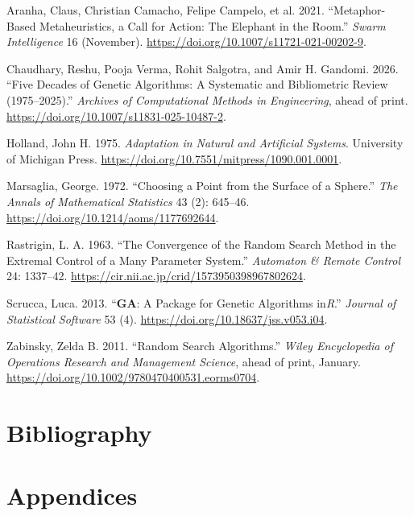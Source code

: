 \documentclass[
  a4paper,
  DIV=11,
  numbers=noendperiod]{scrartcl}
\newlength{\cslhangindent}
\newenvironment{CSLReferences}[2] %
 {\begin{list}{}{%
  \setlength{\itemindent}{0pt}
  \setlength{\leftmargin}{0pt}
  \setlength{\parsep}{0pt}
  \ifodd #1
   \setlength{\leftmargin}{\cslhangindent}
   \setlength{\itemindent}{-1\cslhangindent}
  \fi
  \setlength{\itemsep}{#2\baselineskip}}}
 {\end{list}}
\newcommand{\+}{\phantom{-}}
\begin{document}
\protect{}\label{refs}
\begin{CSLReferences}{1}{1}
Aranha, Claus, Christian Camacho, Felipe Campelo, et al. 2021.
{``Metaphor-Based Metaheuristics, a Call for Action: The Elephant in the
Room.''} \emph{Swarm Intelligence} 16 (November).
\url{https://doi.org/10.1007/s11721-021-00202-9}.

Chaudhary, Reshu, Pooja Verma, Rohit Salgotra, and Amir H. Gandomi.
2026. {``Five Decades of Genetic Algorithms: A Systematic and
Bibliometric Review (1975--2025).''} \emph{Archives of Computational
Methods in Engineering}, ahead of print.
\url{https://doi.org/10.1007/s11831-025-10487-2}.

Holland, John H. 1975. \emph{{Adaptation in Natural and Artificial
Systems}}. University of Michigan Press.
\url{https://doi.org/10.7551/mitpress/1090.001.0001}.

Marsaglia, George. 1972. {``Choosing a Point from the Surface of a
Sphere.''} \emph{The Annals of Mathematical Statistics} 43 (2): 645--46.
\url{https://doi.org/10.1214/aoms/1177692644}.

Rastrigin, L. A. 1963. {``The Convergence of the Random Search Method in
the Extremal Control of a Many Parameter System.''} \emph{Automaton \&
Remote Control} 24: 1337--42.
\url{https://cir.nii.ac.jp/crid/1573950398967802624}.

Scrucca, Luca. 2013. {``{\textbf{GA}}: A Package for Genetic Algorithms
in{\emph{R}}.''} \emph{Journal of Statistical Software} 53 (4).
\url{https://doi.org/10.18637/jss.v053.i04}.

Zabinsky, Zelda B. 2011. {``Random Search Algorithms.''} \emph{Wiley
Encyclopedia of Operations Research and Management Science}, ahead of
print, January. \url{https://doi.org/10.1002/9780470400531.eorms0704}.

\end{CSLReferences}

\section{Bibliography}\label{bibliography}

\newpage

\section{Appendices}\label{appendices}
\end{document}
